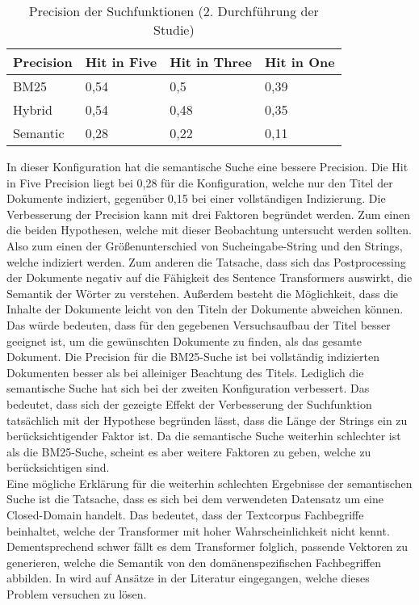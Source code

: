 \begin{table}[!ht]
    \centering
    \label{precision-tabelle-2}
    \begin{tabular}{|l|l|l|l|}
        \hline
        Precision & Hit in Five & Hit in Three & Hit in One \\ \hline
        BM25 & 0,54 & 0,5 & 0,39 \\ \hline
        Hybrid & 0,54 & 0,48 & 0,35 \\ \hline
        Semantic & 0,28 & 0,22 & 0,11 \\ \hline
    \end{tabular}
    \caption[Precision (2. Durchführung)]{Precision der Suchfunktionen (2. Durchführung der Studie)}
\end{table}

In dieser Konfiguration hat die semantische Suche eine bessere Precision.
Die Hit in Five Precision liegt bei 0,28 für die Konfiguration, welche nur den Titel der Dokumente indiziert, gegenüber 0,15 bei einer vollständigen Indizierung.
Die Verbesserung der Precision kann mit drei Faktoren begründet werden.
Zum einen die beiden Hypothesen, welche mit dieser Beobachtung untersucht werden sollten.
Also zum einen der Größenunterschied von Sucheingabe-String und den Strings, welche indiziert werden.
Zum anderen die Tatsache, dass sich das Postprocessing der Dokumente negativ auf die Fähigkeit des Sentence Transformers auswirkt, die Semantik der Wörter zu verstehen.
Außerdem besteht die Möglichkeit, dass die Inhalte der Dokumente leicht von den Titeln der Dokumente abweichen können.
Das würde bedeuten, dass für den gegebenen Versuchsaufbau der Titel besser geeignet ist, um die gewünschten Dokumente zu finden, als das gesamte Dokument.
Die Precision für die BM25-Suche ist bei vollständig indizierten Dokumenten besser als bei alleiniger Beachtung des Titels.
Lediglich die semantische Suche hat sich bei der zweiten Konfiguration verbessert.
Das bedeutet, dass sich der gezeigte Effekt der Verbesserung der Suchfunktion tatsächlich mit der Hypothese begründen lässt, dass die Länge der Strings ein zu berücksichtigender Faktor ist.
Da die semantische Suche weiterhin schlechter ist als die BM25-Suche, scheint es aber weitere Faktoren zu geben, welche zu berücksichtigen sind.\\

Eine mögliche Erklärung für die weiterhin schlechten Ergebnisse der semantischen Suche ist die Tatsache, dass es sich bei dem verwendeten Datensatz um eine Closed-Domain handelt.
Das bedeutet, dass der Textcorpus Fachbegriffe beinhaltet, welche der Transformer mit hoher Wahrscheinlichkeit nicht kennt.
Dementsprechend schwer fällt es dem Transformer folglich, passende Vektoren zu generieren, welche die Semantik von den domänenspezifischen Fachbegriffen abbilden.
In  wird auf Ansätze in der Literatur eingegangen, welche dieses Problem versuchen zu lösen.

